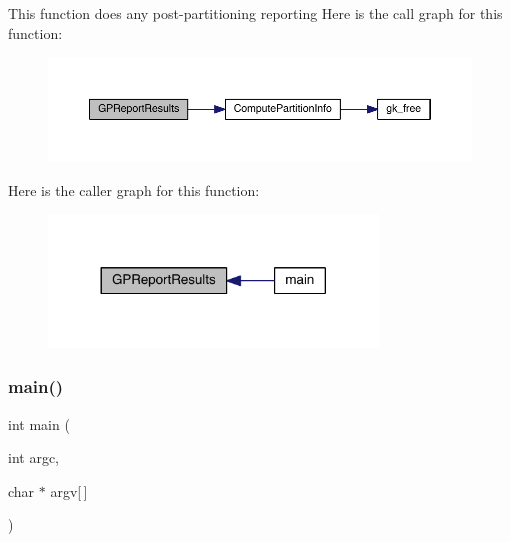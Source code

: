 This function does any post-\/partitioning reporting Here is the call graph for this function\+:\nopagebreak
\begin{figure}[H]
\begin{center}
\leavevmode
\includegraphics[width=350pt]{a00311_af57a862e6ce57a691244341103615ed2_cgraph}
\end{center}
\end{figure}
Here is the caller graph for this function\+:\nopagebreak
\begin{figure}[H]
\begin{center}
\leavevmode
\includegraphics[width=248pt]{a00311_af57a862e6ce57a691244341103615ed2_icgraph}
\end{center}
\end{figure}
\mbox{\label{a00311_a0ddf1224851353fc92bfbff6f499fa97}} 
\subsubsection{\texorpdfstring{main()}{main()}}
{\footnotesize\ttfamily int main (\begin{DoxyParamCaption}\item[{int}]{argc,  }\item[{char $\ast$}]{argv\mbox{[}$\,$\mbox{]} }\end{DoxyParamCaption})}


